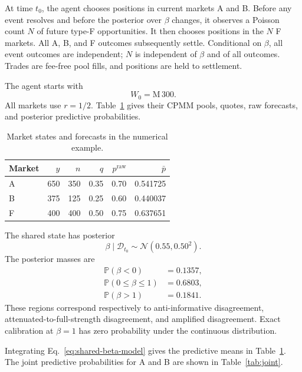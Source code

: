 \documentclass[journal,a4paper]{IEEEtran}
\newcommand{\Prb}{\mathbb{P}}
\newcommand{\Normal}{\mathcal{N}}
\begin{document}
At time $t_0$, the agent chooses positions in current markets A and B. Before any event resolves and before the posterior over $\beta$ changes, it observes a Poisson count $N$ of future type-F opportunities. It then chooses positions in the $N$ F markets. All A, B, and F outcomes subsequently settle. Conditional on $\beta$, all event outcomes are independent; $N$ is independent of $\beta$ and of all outcomes. Trades are fee-free pool fills, and positions are held to settlement.

The agent starts with
\begin{equation}
W_0=\text{M}\,300.
\end{equation}
All markets use $r=1/2$. Table~\ref{tab:markets} gives their CPMM pools, quotes, raw forecasts, and posterior predictive probabilities.

\begin{table}[!t]
\centering
\caption{Market states and forecasts in the numerical example.}
\label{tab:markets}
\begin{tabular}{@{}lrrrrr@{}}
\toprule
Market & $y$ & $n$ & $q$ & $p^{\mathrm{raw}}$ & $\bar p$\\
\midrule
A & 650 & 350 & 0.35 & 0.70 & 0.541725\\
B & 375 & 125 & 0.25 & 0.60 & 0.440037\\
F & 400 & 400 & 0.50 & 0.75 & 0.637651\\
\bottomrule
\end{tabular}
\end{table}

The shared state has posterior
\begin{equation}
\beta\mid\mathcal{D}_{t_0}
\sim
\Normal(0.55,0.50^2).
\label{eq:example-beta}
\end{equation}
The posterior masses are
\begin{align}
\Prb(\beta<0)&=0.1357,\\
\Prb(0\leq\beta\leq1)&=0.6803,\\
\Prb(\beta>1)&=0.1841.
\end{align}
These regions correspond respectively to anti-informative disagreement, attenuated-to-full-strength disagreement, and amplified disagreement. Exact calibration at $\beta=1$ has zero probability under the continuous distribution.

Integrating Eq.~\eqref{eq:shared-beta-model} gives the predictive means in Table~\ref{tab:markets}. The joint predictive probabilities for A and B are shown in Table~\ref{tab:joint}.
\end{document}
